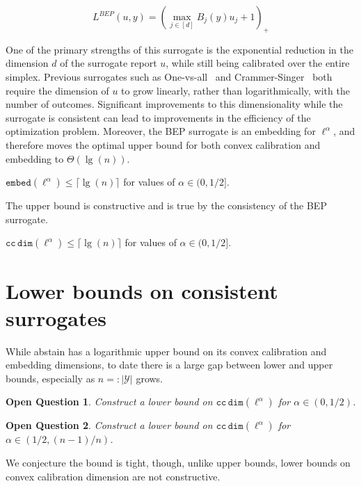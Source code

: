 \documentclass[anon,12pt]{colt2021} %
\newcommand{\ccdim}{\mathtt{cc\,dim}}
\newcommand{\embed}{\mathtt{embed}}
\newcommand{\Y}{\mathcal{Y}}
\newtheorem{openq}{Open Question}
\begin{document}
\begin{equation}
L^{BEP}(u,y) = \left( \max_{j \in [d]} B_j(y) u_j + 1 \right)_+ \tag*{BEP} 
\end{equation}


One of the primary strengths of this surrogate is the exponential reduction in the dimension $d$ of the surrogate report $u$, while still being calibrated over the entire simplex.
Previous surrogates such as One-vs-all~\citep{rifkin2004defense} and Crammer-Singer~\citep{crammer2001algorithmic} both require the dimension of $u$ to grow linearly, rather than logarithmically, with the number of outcomes.
Significant improvements to this dimensionality while the surrogate is consistent can lead to improvements in the efficiency of the optimization problem.
Moreover, the BEP surrogate is an embedding for $\ell^\alpha$, and therefore moves the optimal upper bound for both convex calibration and embedding to $\Theta(\lg(n))$.

\begin{theorem}
	$\embed(\ell^{\alpha}) \leq \lceil \lg(n) \rceil$ for values of $\alpha \in (0,1/2]$.
\end{theorem}
The upper bound is constructive and is true by the consistency of the BEP surrogate.
\begin{corollary}
	$\ccdim(\ell^{\alpha}) \leq \lceil \lg(n) \rceil$ for values of $\alpha \in (0,1/2]$.
\end{corollary}


\section{Lower bounds on consistent surrogates}

While abstain has a logarithmic upper bound on its convex calibration and embedding dimensions, to date there is a large gap between lower and upper bounds, especially as $n =: |\Y|$ grows.

\begin{openq}
	Construct a lower bound on $\ccdim(\ell^\alpha)$ for $\alpha \in (0,1/2)$.
\end{openq}

\begin{openq}
	Construct a lower bound on $\ccdim(\ell^\alpha)$ for $\alpha \in (1/2, (n-1) / n)$.
\end{openq}

We conjecture the bound is tight, though, unlike upper bounds, lower bounds on convex calibration dimension are not constructive.
\end{document}
